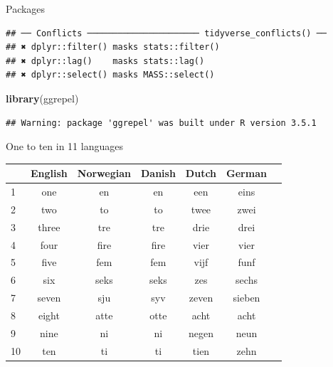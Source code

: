 \documentclass[ignorenonframetext,]{beamer}
\newenvironment{Shaded}{\begin{snugshade}}{\end{snugshade}}
\newcommand{\KeywordTok}[1]{\textcolor[rgb]{0.13,0.29,0.53}{\textbf{#1}}}
\newcommand{\NormalTok}[1]{#1}
\begin{document}
\begin{frame}[fragile]{Packages}
\begin{verbatim}
## ── Conflicts ────────────────────── tidyverse_conflicts() ──
## ✖ dplyr::filter() masks stats::filter()
## ✖ dplyr::lag()    masks stats::lag()
## ✖ dplyr::select() masks MASS::select()
\end{verbatim}

\begin{Shaded}
\begin{Highlighting}[]
\KeywordTok{library}\NormalTok{(ggrepel)}
\end{Highlighting}
\end{Shaded}

\begin{verbatim}
## Warning: package 'ggrepel' was built under R version 3.5.1
\end{verbatim}

\end{frame}

\begin{frame}{One to ten in 11 languages}
\protect\hypertarget{one-to-ten-in-11-languages}{}

\begin{tabular}{lcccccc}
& English & Norwegian & Danish & Dutch & German\\
\hline
1 & one & en & en & een & eins\\
2 & two & to & to & twee & zwei\\
3 & three & tre & tre & drie & drei\\
4 & four & fire & fire & vier & vier\\
5 & five & fem & fem & vijf & funf\\
6 & six & seks & seks & zes & sechs\\
7 & seven & sju & syv & zeven & sieben\\
8 & eight & atte & otte & acht & acht\\
9 & nine & ni & ni & negen & neun\\
10 & ten & ti & ti & tien & zehn\\
\hline
\end{tabular}

\end{frame}
\end{document}
